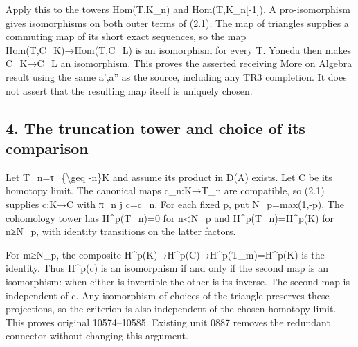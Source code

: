 Apply this to the towers Hom(T,\allowbreak{}K\_\allowbreak{}n)\allowbreak{} and Hom(T,\allowbreak{}K\_\allowbreak{}n[-1]\allowbreak{})\allowbreak{}. A pro-isomorphism gives isomorphisms on both outer terms of (2.1)\allowbreak{}. The map of triangles supplies a commuting map of its short exact sequences,\allowbreak{} so the map Hom(T,\allowbreak{}C\_\allowbreak{}K)\allowbreak{}\allowbreak{}→Hom(T,\allowbreak{}C\_\allowbreak{}L)\allowbreak{} is an isomorphism for every T. Yoneda then makes C\_\allowbreak{}K\allowbreak{}→C\_\allowbreak{}L an isomorphism. This proves the asserted receiving More on Algebra result using the same a',\allowbreak{}a'' as the source,\allowbreak{} including any TR3 completion. It does not assert that the resulting map itself is uniquely chosen.

\subsection{4. The truncation tower and choice of its comparison}\label{proofs-10435-10686-the-truncation-tower-and-choice-of-its-comparison}

Let T\_\allowbreak{}n\allowbreak{}=τ\_\allowbreak{}\{\textbackslash{}geq -n\}K and assume its product in D(A)\allowbreak{} exists. Let C be its homotopy limit. The canonical maps c\_\allowbreak{}n:\allowbreak{}K\allowbreak{}→T\_\allowbreak{}n are compatible,\allowbreak{} so (2.1)\allowbreak{} supplies c:\allowbreak{}K\allowbreak{}→C with π\_\allowbreak{}n j c\allowbreak{}=c\_\allowbreak{}n. For each fixed p,\allowbreak{} put N\_\allowbreak{}p\allowbreak{}=max(1,\allowbreak{}-p)\allowbreak{}. The cohomology tower has H\textasciicircum{}p(T\_\allowbreak{}n)\allowbreak{}\allowbreak{}=0 for n<N\_\allowbreak{}p and H\textasciicircum{}p(T\_\allowbreak{}n)\allowbreak{}\allowbreak{}=H\textasciicircum{}p(K)\allowbreak{} for n≥N\_\allowbreak{}p,\allowbreak{} with identity transitions on the latter factors.

For m≥N\_\allowbreak{}p,\allowbreak{} the composite H\textasciicircum{}p(K)\allowbreak{}\allowbreak{}→H\textasciicircum{}p(C)\allowbreak{}\allowbreak{}→H\textasciicircum{}p(T\_\allowbreak{}m)\allowbreak{}\allowbreak{}=H\textasciicircum{}p(K)\allowbreak{} is the identity. Thus H\textasciicircum{}p(c)\allowbreak{} is an isomorphism if and only if the second map is an isomorphism:\allowbreak{} when either is invertible the other is its inverse. The second map is independent of c. Any isomorphism of choices of the triangle preserves these projections,\allowbreak{} so the criterion is also independent of the chosen homotopy limit. This proves original 10574–\allowbreak{}10585. Existing unit 0887 removes the redundant connector without changing this argument.


